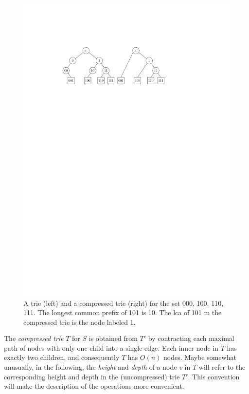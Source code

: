 \documentclass[a4paper,11pt]{article}
\newcommand{\?}{\mskip1.5mu}
\begin{document}
\begin{figure}
  \centering
  \includegraphics{trie}
  \caption{A trie (left) and a compressed trie (right) for the set 
  000, 100, 110, 111. The longest common prefix of 101 is  10. The 
  lca of 101 in the compressed trie
    is the node labeled 1.}
  \label{fig:trie}
\end{figure}

The \emph{compressed trie} $T$ for $S$ is obtained
from $T'$ by contracting each maximal path of nodes
with only one child into a single edge. 
Each inner node in $T$ has exactly two children, and
consequently $T$ has $O(n)$ nodes.
Maybe somewhat unusually, in the following, the 
\emph{height} and \emph{depth} of a node $v$ in $T$ 
will refer to the corresponding
height and depth in the (uncompressed) trie $T'$.
This convention will make the description of the operations more
convenient.
\end{document}
